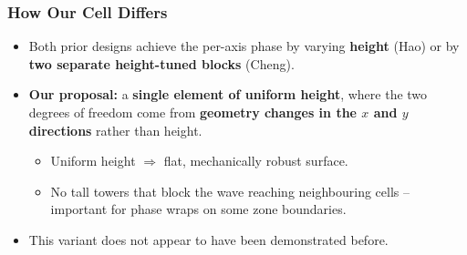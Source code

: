 \documentclass[aspectratio=43]{beamer}
\begin{document}
\begin{frame}[fragile]
  \frametitle{How Our Cell Differs}
  \begin{itemize}
    \item Both prior designs achieve the per-axis phase by varying
      \textbf{height} (Hao) or by \textbf{two separate height-tuned blocks}
      (Cheng).
    \item \textbf{Our proposal:} a \textbf{single element of uniform height},
      where the two degrees of freedom come from \textbf{geometry changes in
        the $x$ and $y$ directions} rather than height.
      \begin{itemize}
        \item Uniform height $\Rightarrow$ flat, mechanically robust surface.
        \item No tall towers that block the wave reaching neighbouring cells -- important for phase wraps on some zone boundaries.
      \end{itemize}
    \item This variant does not appear to have been demonstrated before.
  \end{itemize}
\end{frame}
\end{document}
